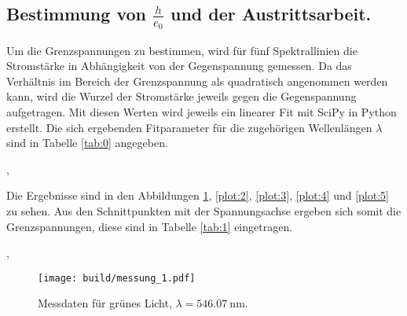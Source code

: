 
\subsection{\texorpdfstring{Bestimmung von $\frac{h}{e_0}$ und der Austrittsarbeit}{Bestimmung von h/e und der Austrittsarbeit}.}

Um die Grenzspannungen zu bestimmen, wird für fünf Spektrallinien die Stromstärke in Abhängigkeit von der Gegenspannung gemessen.
Da das Verhältnis im Bereich der Grenzspannung als quadratisch angenommen werden kann, wird die Wurzel der Stromstärke jeweils gegen die Gegenspannung aufgetragen.
Mit diesen Werten wird jeweils ein linearer Fit mit SciPy in Python erstellt.
Die sich ergebenden Fitparameter für die zugehörigen Wellenlängen $\lambda$ \cite{skript} sind in Tabelle \ref{tab:0} angegeben.

,

Die Ergebnisse sind in den Abbildungen \ref{plot:1}, \ref{plot:2}, \ref{plot:3}, \ref{plot:4} und \ref{plot:5} zu sehen.
Aus den Schnittpunkten mit der Spannungsachse ergeben sich somit die Grenzspannungen, diese sind in Tabelle \ref{tab:1} eingetragen.

,

\begin{figure}
  \centering
  \texttt{[image: build/messung\_1.pdf]}
  \caption{Messdaten für grünes Licht, $\lambda = \SI{546,07}{\nano\metre}$.}
  \label{plot:1}
\end{figure}

